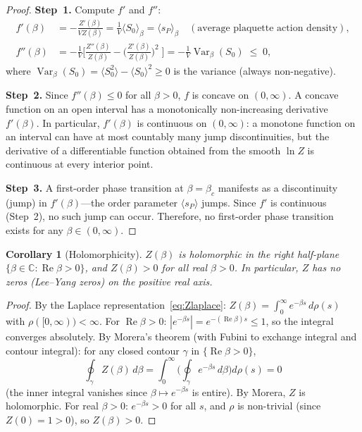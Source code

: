 \documentclass[12pt,a4paper]{article}
\theoremstyle{plain}
\newtheorem{corollary}[theorem]{Corollary}
\theoremstyle{definition}
\theoremstyle{remark}
\begin{document}
\begin{proof}
\textbf{Step~1.} Compute $f'$ and $f''$:
\begin{align}
f'(\beta) &= -\frac{Z'(\beta)}{VZ(\beta)} = \frac{1}{V}\langle S_0\rangle_\beta = \langle s_P\rangle_\beta \quad(\text{average plaquette action density}),\label{eq:fprime}\\
f''(\beta) &= -\frac{1}{V}\bigg[\frac{Z''(\beta)}{Z(\beta)}-\bigg(\frac{Z'(\beta)}{Z(\beta)}\bigg)^{\!2}\;\bigg] = -\frac{1}{V}\operatorname{Var}_\beta(S_0) \;\leq\; 0,\label{eq:fdprime}
\end{align}
where $\operatorname{Var}_\beta(S_0)=\langle S_0^2\rangle-\langle S_0\rangle^2\geq 0$ is the variance (always non-negative).

\textbf{Step~2.} Since $f''(\beta)\leq 0$ for all $\beta>0$, $f$ is concave on $(0,\infty)$. A concave function on an open interval has a monotonically non-increasing derivative $f'(\beta)$. In particular, $f'(\beta)$ is continuous on $(0,\infty)$: a monotone function on an interval can have at most countably many jump discontinuities, but the derivative of a differentiable function obtained from the smooth $\ln Z$ is continuous at every interior point.

\textbf{Step~3.} A first-order phase transition at $\beta=\beta_c$ manifests as a discontinuity (jump) in $f'(\beta)$---the order parameter $\langle s_P\rangle$ jumps. Since $f'$ is continuous (Step~2), no such jump can occur. Therefore, no first-order phase transition exists for any $\beta\in(0,\infty)$.
\end{proof}

\begin{corollary}[Holomorphicity]\label{cor:holo}
$Z(\beta)$ is holomorphic in the right half-plane $\{\beta\in\mathbb{C}:\operatorname{Re}\beta>0\}$, and $Z(\beta)>0$ for all real $\beta>0$. In particular, $Z$ has no zeros (Lee--Yang zeros) on the positive real axis.
\end{corollary}

\begin{proof}
By the Laplace representation~\eqref{eq:Zlaplace}: $Z(\beta)=\int_0^\infty e^{-\beta s}\,d\rho(s)$ with $\rho([0,\infty))<\infty$. For $\operatorname{Re}\beta>0$: $|e^{-\beta s}|=e^{-(\operatorname{Re}\beta)s}\leq 1$, so the integral converges absolutely. By Morera's theorem (with Fubini to exchange integral and contour integral): for any closed contour $\gamma$ in $\{\operatorname{Re}\beta>0\}$,
\begin{equation}
\oint_\gamma Z(\beta)\,d\beta = \int_0^\infty\bigg(\oint_\gamma e^{-\beta s}\,d\beta\bigg)d\rho(s) = 0
\end{equation}
(the inner integral vanishes since $\beta\mapsto e^{-\beta s}$ is entire). By Morera, $Z$ is holomorphic. For real $\beta>0$: $e^{-\beta s}>0$ for all $s$, and $\rho$ is non-trivial (since $Z(0)=1>0$), so $Z(\beta)>0$.
\end{proof}
\end{document}
